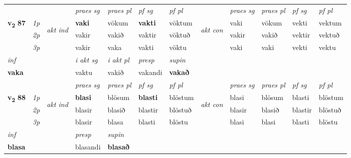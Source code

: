 \begin{longtable}[l]{X>{\footnotesize\itshape}llXXXXlXXXX}
\midrule

 & &   & \textit{praes sg}  & \textit{praes pl}    & \textit{ pf sg} & \textit{pf pl} & & \textit{praes sg}  & \textit{praes pl}    & \textit{pf sg} & \textit{pf pl }  \\ \cmidrule{4-7} \cmidrule{9-12}
 \multirow{2}{*}{{{\textbf{v{\textsubscript{2}}} \Large{\textbf{87}}}}}  & 1p & \multirow{3}{*}{\begin{turn}{90}\textit{akt ind}\end{turn}} & \textbf{vaki} & vökum & \textbf{vakti} & vöktum & \multirow{3}{*}{\begin{turn}{90}\textit{akt con}\end{turn}} &vaki & vökum & vekti & vektum\\*
 & 2p &  &  vakir  & vakið & vaktir & vöktuð & & vakir & vakið & vektir & vektuð \\*
 & 3p &  & vakir & vaka & vakti & vöktu & & vaki & vaki& vekti & vektu \\*
\cmidrule{4-7} \cmidrule{9-12}

   {\textit{inf}} & &  & \textit{i akt sg} & \textit{i akt pl}   & \textit{presp} & \textit{supin}   \\*
  {\textbf{vaka}} & && vaktu  & vakið   & vakandi &  \textbf{vakað}   \\*

\midrule

 & &   & \textit{praes sg}  & \textit{praes pl}    & \textit{ pf sg} & \textit{pf pl} & & \textit{praes sg}  & \textit{praes pl}    & \textit{pf sg} & \textit{pf pl }  \\ \cmidrule{4-7} \cmidrule{9-12}
 \multirow{2}{*}{{{\textbf{v{\textsubscript{2}}} \Large{\textbf{88}}}}}  & 1p & \multirow{3}{*}{\begin{turn}{90}\textit{akt ind}\end{turn}} & \textbf{blasi} & blösum & \textbf{blasti} & blöstum & \multirow{3}{*}{\begin{turn}{90}\textit{akt con}\end{turn}} &blasi & blösum & blasti & blöstum\\*
 & 2p &  &  blasir  & blasið & blastir & blöstuð & & blasir & blasið & blastir & blöstuð \\*
 & 3p &  & blasir & blasa & blasti & blöstu & & blasi & blasi& blasti & blöstu \\*
\cmidrule{4-7} \cmidrule{9-12}

   {\textit{inf}} & &     & \textit{presp} & \textit{supin}   \\*
  {\textbf{blasa}} & &     & blasandi &  \textbf{blasað}   \\*


\end{longtable}
